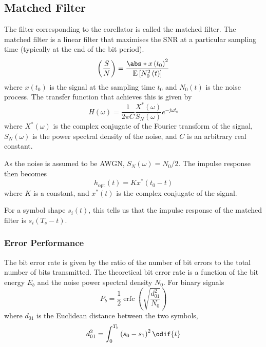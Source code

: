 \documentclass{article}
\DeclareMathOperator{\erfc}{erfc}
\begin{document}
\subsection{Matched Filter}
The filter corresponding to the corellator is called the matched
filter. The matched filter is a linear filter that maximises the SNR at
a particular sampling time (typically at the end of the bit period).
\begin{equation*}
    \left( \frac{S}{N} \right) = \frac{\abs*{x\left( t_0 \right)}^2}{\mathrm{E}\left[ N_0^2\left( t \right) \right]}
\end{equation*}
where \(x\left( t_0 \right)\) is the signal at the sampling time \(t_0\)
and \(N_0\left( t \right)\) is the noise process. The transfer function
that achieves this is given by
\begin{equation*}
    H\left( \omega \right) = \frac{1}{2 \pi C} \frac{X^\ast\left( \omega \right)}{S_N\left( \omega \right)} e^{-j\omega t_o}
\end{equation*}
where \(X^\ast\left( \omega \right)\) is the complex conjugate of the
Fourier transform of the signal, \(S_N\left( \omega \right)\) is the
power spectral density of the noise, and \(C\) is an arbitrary real
constant.

As the noise is assumed to be AWGN, \(S_N\left( \omega \right) =
N_0/2\). The impulse response then becomes
\begin{equation*}
    h_{\mathrm{opt}}\left( t \right) = K x^\ast\left( t_0 - t \right)
\end{equation*}
where \(K\) is a constant, and \(x^\ast\left( t \right)\) is the
complex conjugate of the signal.

For a symbol shape \(s_i\left( t \right)\), this tells us that the
impulse response of the matched filter is \(s_i\left( T_s - t
\right)\).
\subsubsection{Error Performance}
The bit error rate is given by the ratio of the number of bit errors to
the total number of bits transmitted. The theoretical bit error rate is
a function of the bit energy \(E_b\) and the noise power spectral
density \(N_0\). For binary signals
\begin{equation*}
    P_b = \frac{1}{2} \erfc{\left( \sqrt{\frac{d_{\mathrm{01}}^2}{N_0}} \right)}
\end{equation*}
where \(d_{\mathrm{01}}\) is the Euclidean distance between the two
symbols,
\begin{equation*}
    d_{\mathrm{01}}^2 = \int_0^{T_b} \left( s_0 - s_1 \right)^2 \odif{t}
\end{equation*}
\end{document}
